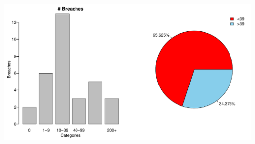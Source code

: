 \documentclass[12pt,a4paper]{paper}
\begin{document}
\begin{enumerate}
\begin{enumerate}
\begin{Schunk}
\end{Schunk}
\includegraphics{Osorio_Daniel_HW3-002}
\end{enumerate}
\end{enumerate}
\end{document}
